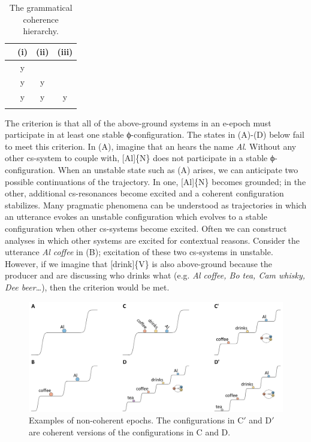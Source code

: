 \begin{table}
\begin{tabularx}{.66\textwidth}{rCCC}
\lsptoprule
& (i) & (ii) & (iii)\\
\midrule 
\raggedleft {} & y &  & \\
\raggedleft {} & y & y & \\
\raggedleft {} & y & y & y\\
\lspbottomrule
\end{tabularx}
\caption{The grammatical coherence hierarchy.}\label{tab:6:1}
\end{table}
  The  criterion is that all of the above-ground systems in an e-epoch must participate in at least one stable ϕ-configuration. The states in {}(A)-(D) below fail to meet this criterion. In (A), imagine that an  hears the name \textit{Al}. Without any other cs-system to couple with, [Al]\{N\} does not participate in a stable ϕ-configuration. When an unstable state such as (A) arises, we can anticipate two possible continuations of the trajectory. In one, [Al]\{N\} becomes grounded; in the other, additional cs-resonances become excited and a coherent configuration stabilizes. Many pragmatic phenomena can be understood as trajectories in which an utterance evokes an unstable configuration which evolves to a stable configuration when other cs-systems become excited. Often we can construct analyses in which other systems are excited for contextual reasons. Consider the utterance \textit{Al coffee} in (B); excitation of these two cs-systems in unstable. However, if we imagine that [drink]\{V\} is also above-ground because the producer and  are discussing who drinks what (e.g. \textit{Al coffee, Bo tea, Cam whisky, Dee beer…}), then the  criterion would be met.

  
\begin{figure}
\includegraphics[width=\textwidth]{figures/Tilsen-img124.png}
\caption{Examples of non-coherent epochs. The configurations in C$'$ and D$'$ are coherent versions of the configurations in C and D.}
\label{fig:6:5}
\end{figure}
 

